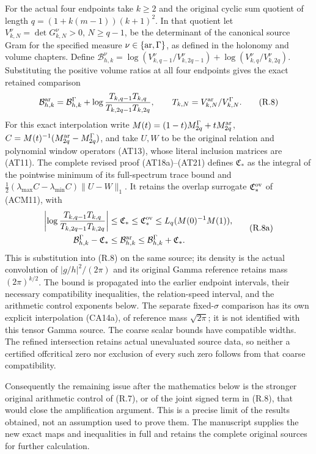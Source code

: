 For the actual four endpoints take $k\ge2$ and the original cyclic
sum quotient of length $q=(1+k(m-1))(k+1)^2$. In that quotient let
$V^\nu_{k,N}=\det G^\nu_{k,N}>0$, $N\ge q-1$, be the determinant
of the canonical source Gram for the specified measure
$\nu\in\{{\rm ar},\Gamma\}$, as defined in the holonomy and
volume chapters. Define
$\mathcal B^\nu_{h,k}=\log(V^\nu_{k,q-1}/V^\nu_{k,2q-1})
+\log(V^\nu_{k,q}/V^\nu_{k,2q})$.
Substituting the positive volume ratios at all four endpoints gives
the exact retained comparison
\[
\mathcal B^{\rm ar}_{h,k}=\mathcal B^\Gamma_{h,k}
+\log\frac{T_{k,q-1}T_{k,q}}
{T_{k,2q-1}T_{k,2q}},\qquad
T_{k,N}=V^{\rm ar}_{k,N}/V^\Gamma_{k,N}.                \tag{R.8}
\]
For this exact interpolation write $M(t)=(1-t)M_{2q}^\Gamma
+tM_{2q}^{\rm ar}$, $C=M(t)^{-1}(M_{2q}^{\rm ar}-M_{2q}^\Gamma)$,
and take $U,W$ to be the original relation and polynomial window
operators (AT13), whose literal inclusion matrices are (AT11).
The complete revised proof (AT18a)--(AT21) defines
$\mathfrak C_*$ as the integral of the pointwise minimum of its
full-spectrum trace bound and $\tfrac12(\lambda_{\max}C-
\lambda_{\min}C)\|U-W\|_1$. It retains the overlap surrogate
$\mathfrak C_*^{\rm ov}$ of (ACM11), with
\[
\begin{aligned}
\left|\log\frac{T_{k,q-1}T_{k,q}}{T_{k,2q-1}T_{k,2q}}\right|
&\le\mathfrak C_*\le\mathfrak C_*^{\rm ov}\le L_q(M(0)^{-1}M(1)),\\
\mathcal B^\Gamma_{h,k}-\mathfrak C_*
&\le\mathcal B^{\rm ar}_{h,k}\le\mathcal B^\Gamma_{h,k}+\mathfrak C_*.
\end{aligned}\tag{R.8a}
\]
This is substitution into (R.8) on the same source; its density is
the actual convolution of $|g/h|^2/(2\pi)$ and its original Gamma
reference retains mass $(2\pi)^{k/2}$. The bound is propagated into
the earlier endpoint intervals, their necessary compatibility
inequalities, the relation-speed interval, and the arithmetic control
exponents below. The separate fixed-$\sigma$ comparison has its own
explicit interpolation (CA14a), of reference mass $\sqrt{2\pi}$;
it is not identified with this tensor Gamma source.
The coarse scalar bounds have compatible widths. The refined
intersection retains actual unevaluated source data, so neither a
certified offcritical zero nor exclusion of every such zero follows
from that coarse compatibility.

Consequently the remaining issue after the mathematics below is the
stronger original arithmetic control of (R.7), or of the joint signed
term in (R.8), that would close the amplification argument. This is a
precise limit of the results obtained, not an assumption used to prove
them. The manuscript supplies the new exact maps and inequalities in
full and retains the complete original sources for further calculation.
